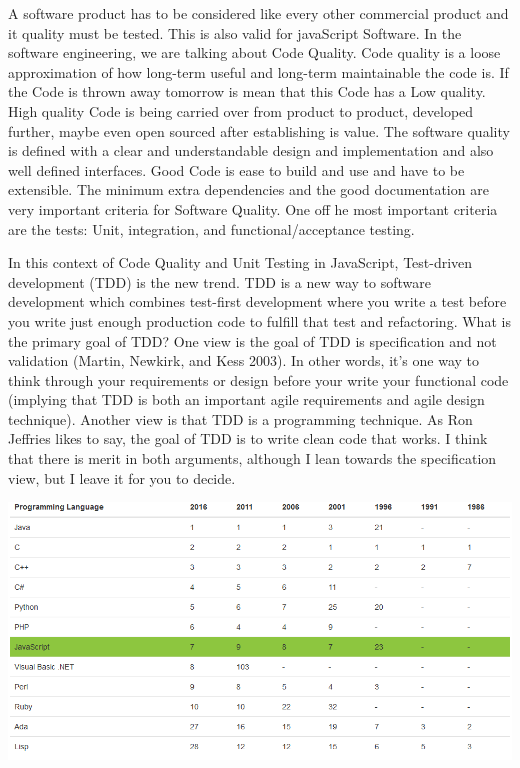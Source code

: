 \documentclass[11pt]{article}
\begin{document}
A software product has to be considered like every other commercial product and it quality must be tested. This is also valid for javaScript Software. In the software engineering, we are talking about Code Quality. Code quality is a loose approximation of how long-term useful and long-term maintainable the code is. If the Code is thrown away tomorrow is mean that this Code has a Low quality. High quality Code is being carried over from product to product, developed further, maybe even open sourced after establishing is value. The software quality is defined with a clear and understandable design and implementation and also well defined interfaces. Good Code is ease to build and use and have to be extensible. The minimum extra dependencies and the good documentation are very important criteria for Software Quality. One off he most important criteria are the tests: Unit, integration, and functional/acceptance testing.

In this context of Code Quality and Unit Testing in JavaScript, Test-driven development (TDD) is the new trend. TDD is a new way to software development which combines test-first development where you write a test before you write just enough production code to fulfill that test and refactoring. What is the primary goal of TDD? One view is the goal of TDD is specification and not validation (Martin, Newkirk, and Kess 2003). In other words, it’s one way to think through your requirements or design before your write your functional code (implying that TDD is both an important agile requirements and agile design technique). Another view is that TDD is a programming technique. As Ron Jeffries likes to say, the goal of TDD is to write clean code that works. I think that there is merit in both arguments, although I lean towards the specification view, but I leave it for you to decide. 

\includegraphics[scale=0.3]{Motivation.png}
\end{document}
